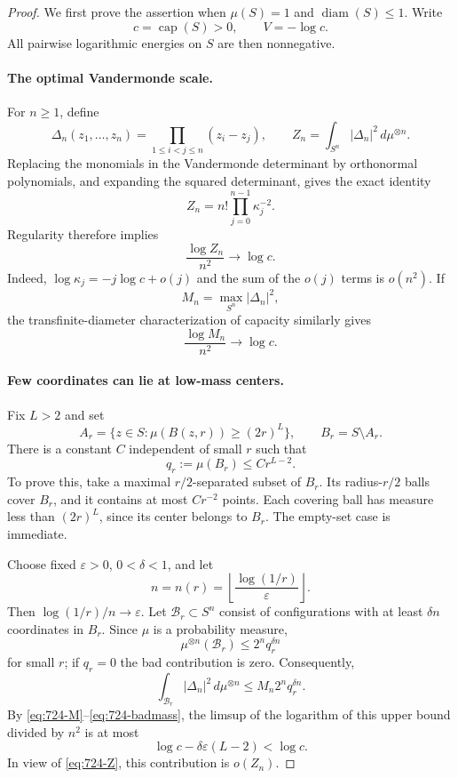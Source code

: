 \documentclass[11pt,a4paper]{article}
\theoremstyle{remark}
\begin{document}
\begin{proof}
We first prove the assertion when $\mu(S)=1$ and $\operatorname{diam}(S)\le1$. Write
\[
 c=\operatorname{cap}(S)>0,\qquad V=-\log c.
\]
All pairwise logarithmic energies on $S$ are then nonnegative.

\paragraph{The optimal Vandermonde scale.}
For $n\ge1$, define
\[
 \Delta_n(z_1,\ldots,z_n)=\prod_{1\le i<j\le n}(z_i-z_j),
 \qquad Z_n=\int_{S^n}|\Delta_n|^2\,d\mu^{\otimes n}.
\]
Replacing the monomials in the Vandermonde determinant by orthonormal polynomials, and expanding the squared determinant, gives the exact identity
\[
 Z_n=n!\prod_{j=0}^{n-1}\kappa_j^{-2}.
\]
Regularity therefore implies
\begin{equation}\label{eq:724-Z}
 \frac{\log Z_n}{n^2}\longrightarrow\log c.
\end{equation}
Indeed, $\log\kappa_j=-j\log c+o(j)$ and the sum of the $o(j)$ terms is $o(n^2)$.
If
\[
 M_n=\max_{S^n}|\Delta_n|^2,
\]
the transfinite-diameter characterization of capacity similarly gives
\begin{equation}\label{eq:724-M}
 \frac{\log M_n}{n^2}\longrightarrow\log c.
\end{equation}

\paragraph{Few coordinates can lie at low-mass centers.}
Fix $L>2$ and set
\[
 A_r=\{z\in S:\mu(B(z,r))\ge(2r)^L\},\qquad B_r=S\setminus A_r.
\]
There is a constant $C$ independent of small $r$ such that
\begin{equation}\label{eq:724-badmass}
 q_r:=\mu(B_r)\le Cr^{L-2}.
\end{equation}
To prove this, take a maximal $r/2$-separated subset of $B_r$. Its radius-$r/2$ balls cover $B_r$, and it contains at most $Cr^{-2}$ points. Each covering ball has measure less than $(2r)^L$, since its center belongs to $B_r$. The empty-set case is immediate.

Choose fixed $\varepsilon>0$, $0<\delta<1$, and let
\[
 n=n(r)=\left\lfloor\frac{\log(1/r)}{\varepsilon}\right\rfloor.
\]
Then $\log(1/r)/n\to\varepsilon$. Let $\mathcal B_r\subset S^n$ consist of configurations with at least $\delta n$ coordinates in $B_r$. Since $\mu$ is a probability measure,
\[
 \mu^{\otimes n}(\mathcal B_r)\le 2^nq_r^{\delta n}
\]
for small $r$; if $q_r=0$ the bad contribution is zero. Consequently,
\[
 \int_{\mathcal B_r}|\Delta_n|^2\,d\mu^{\otimes n}
 \le M_n2^nq_r^{\delta n}.
\]
By \eqref{eq:724-M}--\eqref{eq:724-badmass}, the limsup of the logarithm of this upper bound divided by $n^2$ is at most
\[
 \log c-\delta\varepsilon(L-2)<\log c.
\]
In view of \eqref{eq:724-Z}, this contribution is $o(Z_n)$.


\end{proof}
\end{document}
